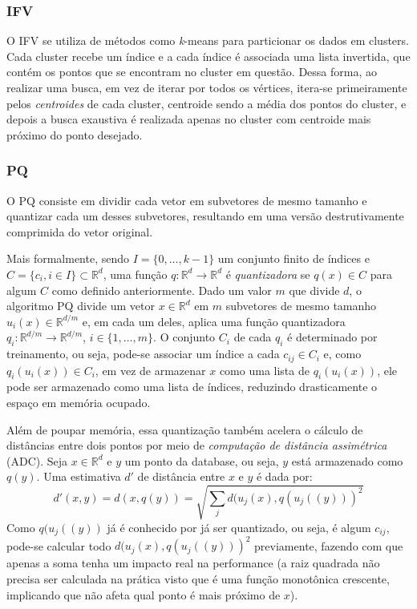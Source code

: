 \documentclass[a4paper, 12pt]{article} %
\begin{document}
\subsubsection{IFV}

O IFV se utiliza de métodos como \textit{k}-means para particionar os dados em clusters. Cada cluster recebe um índice e a cada índice é associada uma lista invertida, que contém os pontos que se encontram no cluster em questão. Dessa forma, ao realizar uma busca, em vez de iterar por todos os vértices, itera-se primeiramente pelos \textit{centroides} de cada cluster, centroide sendo a média dos pontos do cluster, e depois a busca exaustiva é realizada apenas no cluster com centroide mais próximo do ponto desejado.

\subsubsection{PQ}

O PQ consiste em dividir cada vetor em subvetores de mesmo tamanho e quantizar cada um desses subvetores, resultando em uma versão destrutivamente comprimida do vetor original. 

Mais formalmente, sendo $I = \{0, \dots, k-1\}$ um conjunto finito de índices e $C=\{c_i,i \in I\} \subset \mathbb{R}^d$, uma função $q: \mathbb{R}^d \rightarrow \mathbb{R}^d$ é \textit{quantizadora} se $q(x) \in C$ para algum $C$ como definido anteriormente. Dado um valor $m$ que divide $d$, o algoritmo PQ divide um vetor $x \in \mathbb{R}^d$ em $m$ subvetores de mesmo tamanho $u_i(x) \in \mathbb{R}^{d/m}$ e, em cada um deles, aplica uma função quantizadora $q_i: \mathbb{R}^{d/m} \rightarrow \mathbb{R}^{d/m}$, $i \in \{1, \dots, m\}$. O conjunto $C_i$ de cada $q_i$ é determinado por treinamento, ou seja, pode-se associar um índice a cada $c_{ij} \in C_i$ e, como $q_i(u_i(x)) \in C_i$, em vez de armazenar $x$ como uma lista de $q_i(u_i(x))$, ele pode ser armazenado como uma lista de índices, reduzindo drasticamente o espaço em memória ocupado.

Além de poupar memória, essa quantização também acelera o cálculo de distâncias entre dois pontos por meio de \textit{computação de distância assimétrica} (ADC). Seja $x \in \mathbb{R}^d$ e $y$ um ponto da database, ou seja, $y$ está armazenado como $q(y)$. Uma estimativa $d'$ de distância entre $x$ e $y$ é dada por:
\[d'(x,y) = d(x,q(y)) = \sqrt{\sum_{j} d(u_j(x), q(u_j((y)))^2} \]
Como $q(u_j((y))$ já é conhecido por já ser quantizado, ou seja, é algum $c_{ij}$, pode-se calcular todo $d(u_j(x), q(u_j((y)))^2$ previamente, fazendo com que apenas a soma tenha um impacto real na performance (a raiz quadrada não precisa ser calculada na prática visto que é uma função monotônica crescente, implicando que não afeta qual ponto é mais próximo de $x$).
\end{document}
